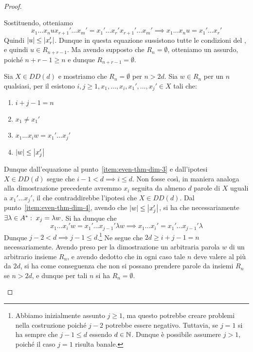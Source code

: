 \begin{proof}
\begin{description}
      Sostituendo, otteniamo
      \[x_1\ldots x_n u x_{r+1}'\ldots x_m' = x_1'\ldots x_r' x_{r+1}'\ldots x_m'\implies x_1\ldots x_n u =x_1'\ldots x_r'\]
      Quindi \(\left|u\right| \leq \left|x_r'\right|\).
      Dunque in questa equazione sussistono tutte le condizioni del , e quindi \(u \in R_{n+r-1}\).
      Ma avendo supposto che \(R_n = \emptyset\), otteniamo un assurdo, poiché \(n+r-1 \geq n\) e dunque \(R_{n+r-1} = \emptyset\).
    \item[\q{\(\implies\)}]
      Sia \(X \in DD(d)\) e mostriamo che \(R_n = \emptyset\) per \(n > 2d\).
      Sia \(w \in R_n\) per un \(n\) qualsiasi, per il  esistono \(i,j \geq 1, x_1,\ldots,x_i, x_1',\ldots,x_j' \in X\) tali che:
      \begin{enumerate}
        \item \(i+j - 1 = n\)
        \item \(x_1 \neq x_1'\)
        \item \(x_1\ldots x_i w = x_1'\ldots x_j'\)\label{item:even-thm-dim-3}
        \item \(\left|w\right| \leq \left|x_j'\right|\)\label{item:even-thm-dim-4}
      \end{enumerate}
      Dunque dall'equazione al punto~\ref{item:even-thm-dim-3} e dall'ipotesi \(X \in DD(d)\) segue che \(i-1 < d\implies i\leq d\).
      Non fosse così, in maniera analoga alla dimostrazione precedente avremmo \(x_i\) seguita da almeno \(d\) parole di \(X\) uguali a \(x_1'\ldots x_j'\), il che contraddirebbe l'ipotesi che \(X \in DD(d)\).
      Dal punto~\ref{item:even-thm-dim-4}, avendo che \(\left|w\right| \leq \left|x_j'\right|\), si ha che necessariamente \(\exists \lambda \in A^* :\; x_j=\lambda w\).
      Si ha dunque che 
      \[x_1\ldots x_i' w = x_1'\ldots x_{j-1}' \lambda w\implies x_1\ldots x_i' = x_1'\ldots x_{j-1}' \lambda\]
      Dunque \(j-2<d\implies j-1\leq d\).\footnote{Abbiamo inizialmente assunto \(j \geq 1\), ma questo potrebbe creare problemi nella costruzione poiché \(j-2\) potrebbe essere negativo. Tuttavia, se \(j=1\) si ha sempre che \(j-1 \leq d\) essendo \(d \in \mathbb{N}\). Dunque è possibile assumere \(j > 1\), poiché il caso \(j = 1\) risulta banale.}
      Ne segue che \(2d \geq i+j-1 = n\) necessariamente. 
      Avendo preso per la dimostrazione un arbitraria parola \(w\) di un arbitrario insieme \(R_n\), e avendo dedotto che in ogni caso tale \(n\) deve valere al più da \(2d\), si ha come conseguenza che non si possano prendere parole da insiemi \(R_n\) se \(n > 2d\), e dunque per tali \(n\) si ha \(R_n = \emptyset\).
  \end{description}
\end{proof}


